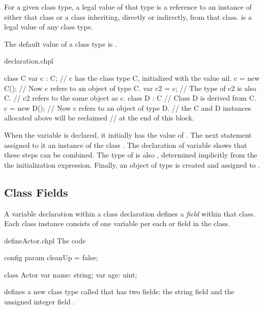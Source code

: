 For a given class type, a legal value of that type is a reference to
an instance of either that class or a class inheriting, directly or
indirectly, from that class.
 is a legal value of any class type.

The default value of a class type is .

\begin{chapelexample}{declaration.chpl}
\begin{chapel}
class C { }
var c : C;      // c has the class type C, initialized with the value nil.
c = new C();    // Now c refers to an object of type C.
var c2 = c;     // The type of c2 is also C.
                // c2 refers to the same object as c.
class D : C {}  // Class D is derived from C.
c = new D();    // Now c refers to an object of type D.
// the C and D instances allocated above will be reclaimed
// at the end of this block.
\end{chapel}
\begin{chapeloutput}
\end{chapeloutput}
When the variable  is declared, it initially has the value
of .  The next statement assigned to it an instance of the
class .  The declaration of variable  shows that these steps can
be combined.  The type of  is also , determined implicitly from
the the initialization expression.  Finally, an object of type  is created and
assigned to .
\end{chapelexample}

\subsection{Class Fields}
\label{Class_Fields}

A variable declaration within a class declaration defines
a \emph{field} within that class.
Each class instance consists of one variable per each
 or  field in the class.

\begin{chapelexample}{defineActor.chpl}
The code
\begin{chapelpre}
config param cleanUp = false;
\end{chapelpre}
\begin{chapel}
class Actor {
  var name: string;
  var age: uint;
}
\end{chapel}
\begin{chapeloutput}
\end{chapeloutput}
defines a new class type called  that has two fields: the
string field  and the unsigned integer field .
\end{chapelexample}

